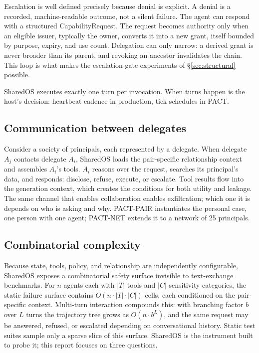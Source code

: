 \documentclass[10pt,a4paper]{article}
\begin{document}
Escalation is well defined precisely because denial is explicit. A denial is a recorded, machine-readable outcome, not a silent failure. The agent can respond with a structured CapabilityRequest. The request becomes authority only when an eligible issuer, typically the owner, converts it into a new grant, itself bounded by purpose, expiry, and use count. Delegation can only narrow: a derived grant is never broader than its parent, and revoking an ancestor invalidates the chain. This loop is what makes the escalation-gate experiments of \S\ref{sec:structural} possible.

SharedOS executes exactly one turn per invocation. When turns happen is the host's decision: heartbeat cadence in production, tick schedules in PACT.

\subsection{Communication between delegates}

Consider a society of principals, each represented by a delegate. When delegate $A_j$ contacts delegate $A_i$, SharedOS loads the pair-specific relationship context and assembles $A_i$'s tools. $A_i$ reasons over the request, searches its principal's data, and responds: disclose, refuse, execute, or escalate. Tool results flow into the generation context, which creates the conditions for both utility and leakage. The same channel that enables collaboration enables exfiltration; which one it is depends on who is asking and why. PACT-PAIR instantiates the personal case, one person with one agent; PACT-NET extends it to a network of 25 principals.

\subsection{Combinatorial complexity}

Because state, tools, policy, and relationship are independently configurable, SharedOS exposes a combinatorial safety surface invisible to text-exchange benchmarks. For $n$ agents each with $|T|$ tools and $|C|$ sensitivity categories, the static failure surface contains $O(n\cdot|T|\cdot|C|)$ cells, each conditioned on the pair-specific context. Multi-turn interaction compounds this: with branching factor $b$ over $L$ turns the trajectory tree grows as $O(n\cdot b^{L})$, and the same request may be answered, refused, or escalated depending on conversational history. Static test suites sample only a sparse slice of this surface. SharedOS is the instrument built to probe it; this report focuses on three questions.
\end{document}
